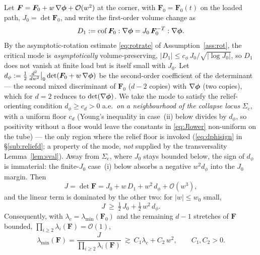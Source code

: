 \begin{lemma}
    \label{lem:relief}
    Let $\bm{F}=\bm{F}_0+w\,\nabla\bm{\phi}+\mathcal{O}(w^2)$ at the corner, with $\bm{F}_0=\bm{F}_0(t)$ on the loaded path,
    $J_0=\det\bm{F}_0$, and write the first-order volume change as
    \begin{equation}
        \label{eq:rotcond}
        D_1:=\operatorname{cof}\bm{F}_0:\nabla\bm{\phi} = J_0\,\bm{F}_0^{-T}:\nabla\bm{\phi} .
    \end{equation}
    By the asymptotic-rotation estimate \eqref{eq:rotrate} of Assumption~\ref{ass:rot}, the critical mode is
    \emph{asymptotically} volume-preserving, $|D_1|\le c_\phi\,J_0/\sqrt{|\log J_0|}$, so $D_1$ does not vanish at finite
    load but is itself small with $J_0$. Let
    $d_\phi:=\tfrac12\,\tfrac{d^2}{dw^2}\big|_{0}\det(\bm{F}_0+w\,\nabla\bm{\phi})$ be the second-order coefficient of
    the determinant --- the second mixed discriminant of $\bm{F}_0$ ($d-2$ copies) with $\nabla\bm{\phi}$ (two copies),
    which for $d=2$ reduces to $\det(\nabla\bm{\phi})$. We take the mode to satisfy the relief-orienting condition
    $d_\phi\ge c_d>0$ a.e.\ \emph{on a neighbourhood of the collapse locus} $\Sigma_{\mathrm{c}}$, with a uniform floor
    $c_d$ (Young's inequality in case~(ii) below divides by $d_\phi$, so positivity without a floor would leave the
    constants in \eqref{eq:Jlower} non-uniform on the tube) --- the only region where the
    relief floor is invoked (\eqref{eq:dphisign} in \S\ref{sub:reliefd}; a property of the mode, \emph{not} supplied by the
    transversality Lemma~\ref{lem:sval}). Away from $\Sigma_{\mathrm{c}}$, where $J_0$ stays bounded below, the sign of
    $d_\phi$ is immaterial: the finite-$J_0$ case~(i) below absorbs a negative $w^2 d_\phi$ into the $J_0$ margin. Then
    \begin{equation}
        \label{eq:Jexp}
        J = \det\bm{F} = J_0 + w\,D_1 + w^2\,d_\phi + \mathcal{O}(w^3),
    \end{equation}
    and the linear term is dominated by the other two: for $|w|\le w_0$ small,
    \begin{equation}
        \label{eq:Jlower}
        J \ \ge\ \tfrac12\,J_0 + \tfrac12\,w^2\,d_\phi .
    \end{equation}
    Consequently, with $\lambda_c=\lambda_{\min}(\bm{F}_0)$ and the remaining $d-1$ stretches of $\bm{F}$ bounded,
    $\prod_{i\ge2}\lambda_i(\bm{F})=\mathcal{O}(1)$,
    \begin{equation}
        \label{eq:lminrelief}
        \lambda_{\min}(\bm{F}) = \frac{J}{\prod_{i\ge2}\lambda_i(\bm{F})} \ \gtrsim\ C_1\lambda_c + C_2\,w^2,
        \qquad C_1,C_2>0 .
    \end{equation}
\end{lemma}

